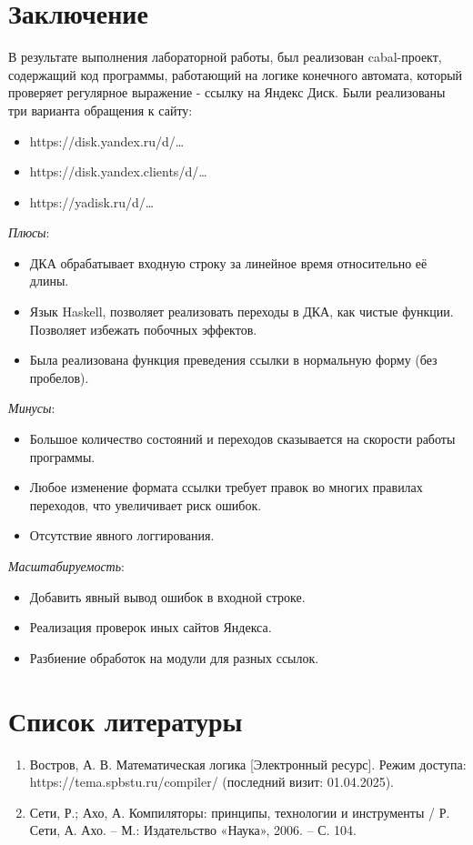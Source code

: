 \documentclass[areasetadvanced]{scrartcl}
\begin{document}
\section*{Заключение}
В результате выполнения лабораторной работы, был реализован cabal-проект, содержащий код программы, работающий на логике конечного автомата, который проверяет регулярное выражение - ссылку на Яндекс Диск. 
Были реализованы три варианта обращения к сайту:
\begin{itemize}
	\item https://disk.yandex.ru/d/\dots
	\item https://disk.yandex.clients/d/\dots
	\item https://yadisk.ru/d/\dots
\end{itemize}
\emph{Плюсы}:
\begin{itemize}
	\item ДКА обрабатывает входную строку за линейное время относительно её длины.
	\item Язык Haskell, позволяет реализовать переходы в ДКА, как чистые функции. Позволяет избежать побочных эффектов.
	\item Была реализована функция преведения ссылки в нормальную форму (без пробелов).
\end{itemize}
\emph{Минусы}:
\begin{itemize}
	\item Большое количество состояний и переходов сказывается на скорости работы программы.
	\item Любое изменение формата ссылки требует правок во многих правилах переходов, что увеличивает риск ошибок.
	\item Отсутствие явного логгирования.
\end{itemize}
\emph{Масштабируемость}:
\begin{itemize}
	\item Добавить явный вывод ошибок в входной строке.
	\item Реализация проверок иных сайтов Яндекса.
	\item Разбиение обработок на модули для разных ссылок.
\end{itemize}
\newpage
\section*{Список литературы}
\begin{enumerate}
    \item \begin{sloppypar}Востров, А. В. Математическая логика [Электронный ресурс]. Режим доступа: https://tema.spbstu.ru/compiler/ (последний визит: 01.04.2025). \end{sloppypar}
    \item Сети, Р.; Ахо, А. Компиляторы: принципы, технологии и инструменты / Р. Сети, А. Ахо. – М.: Издательство «Наука», 2006. – С. 104.
\end{enumerate}
\end{document}
